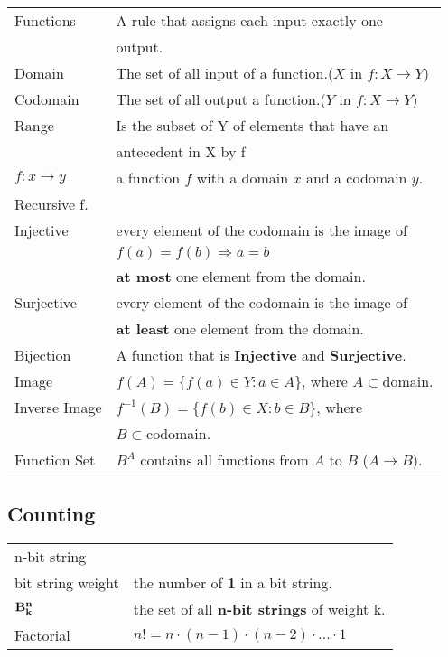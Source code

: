 \documentclass[5pt]{article}
\begin{document}
\begin{multicols}{2}
\begin{tabular}{ll}
    Functions           & A rule that assigns each input exactly one \\
                        & output.\\
    Domain              & The set of all input of a function.($X$ in $f:X\rightarrow Y$)\\
    Codomain            & The set of all output a function.($Y$ in $f:X\rightarrow Y$)\\
    Range               & Is the subset of Y of elements that have an\\
                        & antecedent in X by f\\
    $f:x\rightarrow y$  & a function $f$ with a domain $x$ and a codomain $y$.\\
    Recursive f.        & \\
    Injective           & every element of the codomain is the image  of \\
                        & $f(a)=f(b)\Rightarrow a=b$\\
                        & \textbf{at most} one element from the domain.\\
    Surjective          & every element of the codomain is the image  of \\
                        & \textbf{at least} one element from the domain.\\
    Bijection           & A function that is \textbf{Injective} and \textbf{Surjective}.\\
    Image               & $f(A)=\{f(a)\in Y: a\in A\}$, where $A\subset\text{domain}$.\\
    Inverse Image       & $f^{-1}(B)=\{f(b)\in X: b\in B\}$, where \\
                        & $B\subset\text{codomain}$.\\
    Function Set        & $B^A$ contains all functions from $A$ to $B$ ($A\rightarrow B$).\\
\end{tabular}

\subsection{Counting}

\begin{tabular}{ll}
    n-bit string            & \\
    bit string weight       & the number of \textbf{1} in a bit string.\\
    $\bf{B}^n_k$            & the set of all \textbf{n-bit strings} of weight k.\\
    Factorial               & $n!=n\cdot(n-1)\cdot(n-2)\cdot...\cdot 1$\\
\end{tabular}


\end{multicols}
\end{document}
